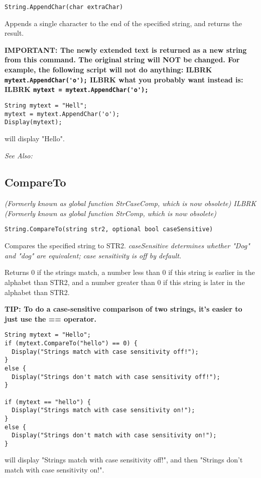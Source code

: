 \begin{verbatim}
String.AppendChar(char extraChar)
\end{verbatim}
Appends a single character to the end of the specified string, and returns the result.

\bf{IMPORTANT:} The newly extended text is returned as a new string from this command.
The original string will \bf{NOT} be changed. For
example, the following script will not do anything: ILBRK
\verb$mytext.AppendChar('o');$ ILBRK
what you probably want instead is: ILBRK
\verb$mytext = mytext.AppendChar('o');$

\begin{verbatim}
String mytext = "Hell";
mytext = mytext.AppendChar('o');
Display(mytext);
\end{verbatim}
will display "Hello".

\it{See Also:} 


\subsection{CompareTo}\label{String.CompareTo}%

\it{(Formerly known as global function StrCaseComp, which is now obsolete)} ILBRK
\it{(Formerly known as global function StrComp, which is now obsolete)}

\begin{verbatim}
String.CompareTo(string str2, optional bool caseSensitive)
\end{verbatim}
Compares the specified string to STR2. \it{caseSensitive} determines whether "Dog" and "dog"
are equivalent; case sensitivity is off by default.

Returns 0 if the strings match, a number less than 0 if this string is earlier in the alphabet than STR2,
and a number greater than 0 if this string is later in the alphabet than STR2.

\bf{TIP:} To do a case-sensitive comparison of two strings, it's easier to just use the == operator.

\begin{verbatim}
String mytext = "Hello";
if (mytext.CompareTo("hello") == 0) {
  Display("Strings match with case sensitivity off!");
}
else {
  Display("Strings don't match with case sensitivity off!");
}

if (mytext == "hello") {
  Display("Strings match with case sensitivity on!");
}
else {
  Display("Strings don't match with case sensitivity on!");
}
\end{verbatim}
will display "Strings match with case sensitivity off!", and then "Strings don't match with case sensitivity on!".


